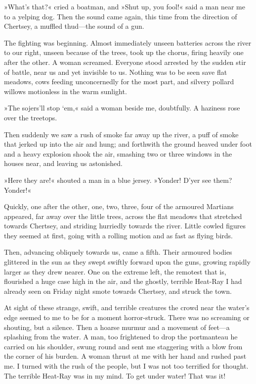 »What's that?« cried a boatman, and »Shut up, you fool!« said a man near me to a yelping dog. Then the sound came again, this time from the direction of Chertsey, a muffled thud—the sound of a gun.

The fighting was beginning. Almost immediately unseen batteries across the river to our right, unseen because of the trees, took up the chorus, firing heavily one after the other. A woman screamed. Everyone stood arrested by the sudden stir of battle, near us and yet invisible to us. Nothing was to be seen save flat meadows, cows feeding unconcernedly for the most part, and silvery pollard willows motionless in the warm sunlight.

»The sojers'll stop `em,« said a woman beside me, doubtfully. A haziness rose over the treetops.

Then suddenly we saw a rush of smoke far away up the river, a puff of smoke that jerked up into the air and hung; and forthwith the ground heaved under foot and a heavy explosion shook the air, smashing two or three windows in the houses near, and leaving us astonished.

»Here they are!« shouted a man in a blue jersey. »Yonder! D'yer see them? Yonder!«

Quickly, one after the other, one, two, three, four of the armoured Martians appeared, far away over the little trees, across the flat meadows that stretched towards Chertsey, and striding hurriedly towards the river. Little cowled figures they seemed at first, going with a rolling motion and as fast as flying birds.

Then, advancing obliquely towards us, came a fifth. Their armoured bodies glittered in the sun as they swept swiftly forward upon the guns, growing rapidly larger as they drew nearer. One on the extreme left, the remotest that is, flourished a huge case high in the air, and the ghostly, terrible Heat-Ray I had already seen on Friday night smote towards Chertsey, and struck the town.

At sight of these strange, swift, and terrible creatures the crowd near the water's edge seemed to me to be for a moment horror-struck. There was no screaming or shouting, but a silence. Then a hoarse murmur and a movement of feet—a splashing from the water. A man, too frightened to drop the portmanteau he carried on his shoulder, swung round and sent me staggering with a blow from the corner of his burden. A woman thrust at me with her hand and rushed past me. I turned with the rush of the people, but I was not too terrified for thought. The terrible Heat-Ray was in my mind. To get under water! That was it!

